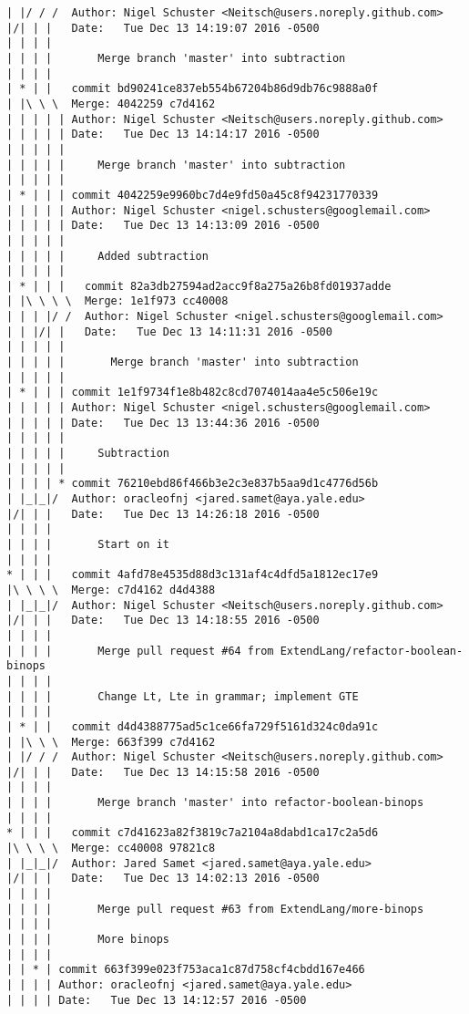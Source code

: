 \begin{lstlisting}
| |/ / /  Author: Nigel Schuster <Neitsch@users.noreply.github.com>
|/| | |   Date:   Tue Dec 13 14:19:07 2016 -0500
| | | |   
| | | |       Merge branch 'master' into subtraction
| | | |       
| * | |   commit bd90241ce837eb554b67204b86d9db76c9888a0f
| |\ \ \  Merge: 4042259 c7d4162
| | | | | Author: Nigel Schuster <Neitsch@users.noreply.github.com>
| | | | | Date:   Tue Dec 13 14:14:17 2016 -0500
| | | | | 
| | | | |     Merge branch 'master' into subtraction
| | | | |      
| * | | | commit 4042259e9960bc7d4e9fd50a45c8f94231770339
| | | | | Author: Nigel Schuster <nigel.schusters@googlemail.com>
| | | | | Date:   Tue Dec 13 14:13:09 2016 -0500
| | | | | 
| | | | |     Added subtraction
| | | | |        
| * | | |   commit 82a3db27594ad2acc9f8a275a26b8fd01937adde
| |\ \ \ \  Merge: 1e1f973 cc40008
| | | |/ /  Author: Nigel Schuster <nigel.schusters@googlemail.com>
| | |/| |   Date:   Tue Dec 13 14:11:31 2016 -0500
| | | | |   
| | | | |       Merge branch 'master' into subtraction
| | | | |      
| * | | | commit 1e1f9734f1e8b482c8cd7074014aa4e5c506e19c
| | | | | Author: Nigel Schuster <nigel.schusters@googlemail.com>
| | | | | Date:   Tue Dec 13 13:44:36 2016 -0500
| | | | | 
| | | | |     Subtraction
| | | | |      
| | | | * commit 76210ebd86f466b3e2c3e837b5aa9d1c4776d56b
| |_|_|/  Author: oracleofnj <jared.samet@aya.yale.edu>
|/| | |   Date:   Tue Dec 13 14:26:18 2016 -0500
| | | |   
| | | |       Start on it
| | | |       
* | | |   commit 4afd78e4535d88d3c131af4c4dfd5a1812ec17e9
|\ \ \ \  Merge: c7d4162 d4d4388
| |_|_|/  Author: Nigel Schuster <Neitsch@users.noreply.github.com>
|/| | |   Date:   Tue Dec 13 14:18:55 2016 -0500
| | | |   
| | | |       Merge pull request #64 from ExtendLang/refactor-boolean-binops
| | | |       
| | | |       Change Lt, Lte in grammar; implement GTE
| | | |       
| * | |   commit d4d4388775ad5c1ce66fa729f5161d324c0da91c
| |\ \ \  Merge: 663f399 c7d4162
| |/ / /  Author: Nigel Schuster <Neitsch@users.noreply.github.com>
|/| | |   Date:   Tue Dec 13 14:15:58 2016 -0500
| | | |   
| | | |       Merge branch 'master' into refactor-boolean-binops
| | | |       
* | | |   commit c7d41623a82f3819c7a2104a8dabd1ca17c2a5d6
|\ \ \ \  Merge: cc40008 97821c8
| |_|_|/  Author: Jared Samet <jared.samet@aya.yale.edu>
|/| | |   Date:   Tue Dec 13 14:02:13 2016 -0500
| | | |   
| | | |       Merge pull request #63 from ExtendLang/more-binops
| | | |       
| | | |       More binops
| | | |     
| | * | commit 663f399e023f753aca1c87d758cf4cbdd167e466
| | | | Author: oracleofnj <jared.samet@aya.yale.edu>
| | | | Date:   Tue Dec 13 14:12:57 2016 -0500

\end{lstlisting}

